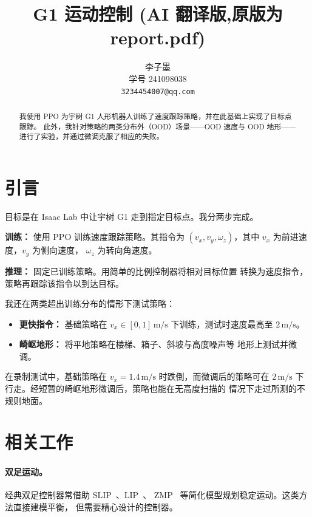 \documentclass[11pt,a4paper]{article}
\title{G1 运动控制 (AI 翻译版,原版为 report.pdf)}
\author{
  \begin{tabular}{c}
    李子墨 \\
    \small 学号 241098038 \\
    \small \texttt{3234454007@qq.com}
  \end{tabular}
}
\date{}
\begin{document}
\maketitle

\begin{abstract}

我使用 PPO 为宇树 G1 人形机器人训练了速度跟踪策略，并在此基础上实现了目标点跟踪。
此外，我针对策略的两类分布外（OOD）场景——OOD 速度与 OOD 地形——进行了实验，并通过微调克服了相应的失败。

\end{abstract}

\section{引言}

目标是在 Isaac Lab 中让宇树 G1 走到指定目标点。我分两步完成。

\textbf{训练：} 使用 PPO 训练速度跟踪策略。其指令为
$(v_x,v_y,\omega_z)$，其中 $v_x$ 为前进速度，$v_y$ 为侧向速度，
$\omega_z$ 为转向角速度。

\textbf{推理：} 固定已训练策略。用简单的比例控制器将相对目标位置
转换为速度指令，策略再跟踪该指令以到达目标。

我还在两类超出训练分布的情形下测试策略：
\begin{itemize}
  \item \textbf{更快指令：} 基础策略在
  $v_x\in[0,1]\,\mathrm{m/s}$ 下训练，测试时速度最高至
  $2\,\mathrm{m/s}$。
  \item \textbf{崎岖地形：} 将平地策略在楼梯、箱子、斜坡与高度噪声等
  地形上测试并微调。
\end{itemize}

在录制测试中，基础策略在
$v_x=1.4\,\mathrm{m/s}$ 时跌倒，而微调后的策略可在
$2\,\mathrm{m/s}$ 下行走。经短暂的崎岖地形微调后，策略也能在无高度扫描的
情况下走过所测的不规则地面。

\section{相关工作}
\label{sec:related}

\paragraph{双足运动。}
经典双足控制器常借助 SLIP~\citep{blickhan1989slip}、LIP~\citep{kajita2001lip}、
ZMP~\citep{vukobratovic2004zmp} 等简化模型规划稳定运动。这类方法直接建模平衡，
但需要精心设计的控制器。
\end{document}
